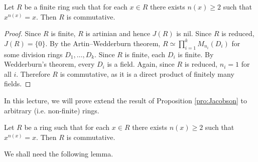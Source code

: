 %

\begin{proposition}
\label{pro:Jacobson}
    Let $R$ be a finite ring such that 
    for each $x\in R$ there exists $n(x)\geq2$ such that 
    $x^{n(x)}=x$. Then $R$ is commutative. 
\end{proposition}

\begin{proof}
    Since $R$ is finite, $R$ is artinian and hence $J(R)$ is nil. 
    Since $R$ is reduced, $J(R)=\{0\}$. 
    By the Artin--Wedderburn theorem, $R\simeq\prod_{i=1}^k M_{n_i}(D_i)$ for some division rings $D_1,\dots,D_k$. 
    Since $R$ is finite, each $D_i$ is finite. By Wedderburn's theorem,
    every $D_i$ is a field. Again, since $R$ is reduced, 
    $n_i=1$ for all $i$. Therefore $R$ is commutative, as it is 
    a direct product of finitely many fields.
\end{proof}

In this lecture, we will prove extend the 
result of 
Proposition \ref{pro:Jacobson} to arbitrary 
(i.e. non-finite) rings. 

\begin{theorem}[Jacobson]
\label{thm:commutativity}
	Let $R$ be a ring such that 
	for each $x\in R$ there exists $n(x)\geq2$ such that 
	$x^{n(x)}=x$. Then $R$ is commutative. 
\end{theorem}

We shall need the following lemma.




